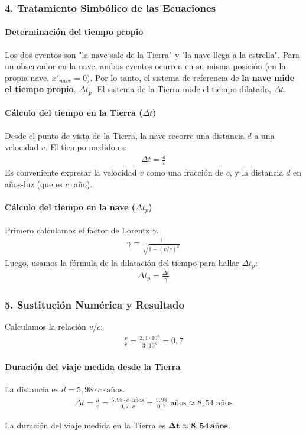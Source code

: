 \subsubsection*{4. Tratamiento Simbólico de las Ecuaciones}
\paragraph*{Determinación del tiempo propio}
Los dos eventos son "la nave sale de la Tierra" y "la nave llega a la estrella". Para un observador en la nave, ambos eventos ocurren en su misma posición (en la propia nave, $x'_{nave}=0$). Por lo tanto, el sistema de referencia de \textbf{la nave mide el tiempo propio}, $\Delta t_p$. El sistema de la Tierra mide el tiempo dilatado, $\Delta t$.

\paragraph*{Cálculo del tiempo en la Tierra ($\Delta t$)}
Desde el punto de vista de la Tierra, la nave recorre una distancia $d$ a una velocidad $v$. El tiempo medido es:
\begin{gather}
    \Delta t = \frac{d}{v}
\end{gather}
Es conveniente expresar la velocidad $v$ como una fracción de $c$, y la distancia $d$ en años-luz (que es $c \cdot \text{año}$).

\paragraph*{Cálculo del tiempo en la nave ($\Delta t_p$)}
Primero calculamos el factor de Lorentz $\gamma$.
\begin{gather}
    \gamma = \frac{1}{\sqrt{1-(v/c)^2}}
\end{gather}
Luego, usamos la fórmula de la dilatación del tiempo para hallar $\Delta t_p$:
\begin{gather}
    \Delta t_p = \frac{\Delta t}{\gamma}
\end{gather}

\subsubsection*{5. Sustitución Numérica y Resultado}
Calculamos la relación $v/c$:
\begin{gather}
    \frac{v}{c} = \frac{2,1 \cdot 10^8}{3 \cdot 10^8} = 0,7
\end{gather}
\paragraph*{Duración del viaje medida desde la Tierra}
La distancia es $d = 5,98 \cdot c \cdot \text{años}$.
\begin{gather}
    \Delta t = \frac{d}{v} = \frac{5,98 \cdot c \cdot \text{años}}{0,7 \cdot c} = \frac{5,98}{0,7} \text{ años} \approx 8,54 \text{ años}
\end{gather}
\begin{cajaresultado}
La duración del viaje medida en la Tierra es $\boldsymbol{\Delta t \approx 8,54 \, \textbf{años}}$.
\end{cajaresultado}

